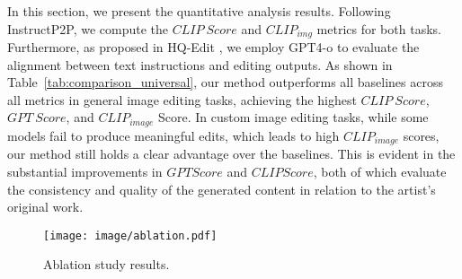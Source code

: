In this section, we present the quantitative analysis results. Following InstructP2P\cite{brooks2023instructpix2pix}, we compute the $CLIP\ Score$ and $CLIP_{img}$ metrics for both tasks. Furthermore, as proposed in HQ-Edit \cite{hui2024hq}, we employ GPT4-o to evaluate the alignment between text instructions and editing outputs. As shown in Table~\ref{tab:comparison_universal}, our method outperforms all baselines across all metrics in general image editing tasks, achieving the highest $CLIP\ Score$, $GPT\ Score$, and $CLIP_{image}$ Score. In custom image editing tasks, while some models fail to produce meaningful edits, which leads to high $CLIP_{image}$ scores, our method still holds a clear advantage over the baselines. This is evident in the substantial improvements in $GPT Score$ and $CLIP Score$, both of which evaluate the consistency and quality of the generated content in relation to the artist's original work.


\begin{figure}[ht]
    \centering
    \texttt{[image: image/ablation.pdf]} %
    \caption{Ablation study results.}
    \label{fig5}
 \end{figure}



